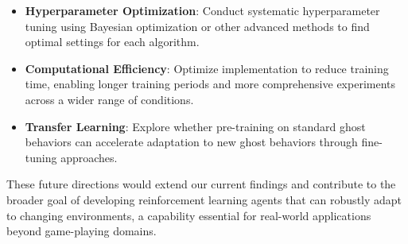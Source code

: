 \documentclass{article} %
\begin{document}
\begin{itemize}
  \item \textbf{Hyperparameter Optimization}: Conduct systematic hyperparameter tuning using Bayesian optimization or other advanced methods to find optimal settings for each algorithm.

  \item \textbf{Computational Efficiency}: Optimize implementation to reduce training time, enabling longer training periods and more comprehensive experiments across a wider range of conditions.

  \item \textbf{Transfer Learning}: Explore whether pre-training on standard ghost behaviors can accelerate adaptation to new ghost behaviors through fine-tuning approaches.
\end{itemize}

These future directions would extend our current findings and contribute to the broader goal of developing reinforcement learning agents that can robustly adapt to changing environments, a capability essential for real-world applications beyond game-playing domains.



\end{document}
